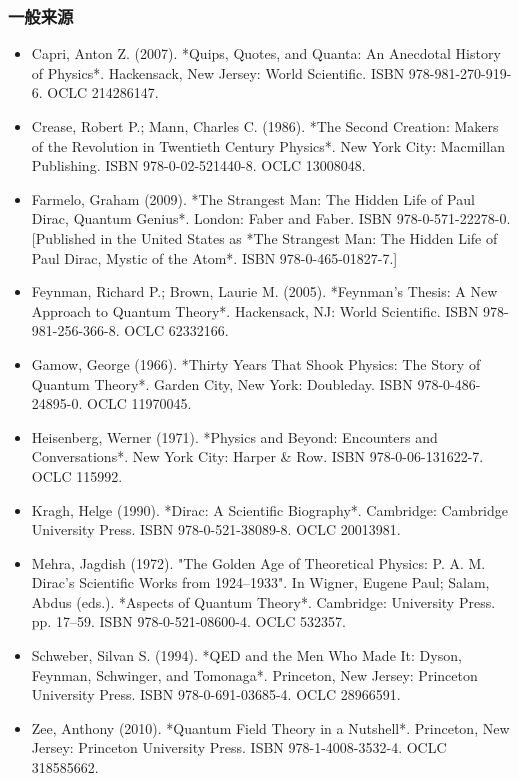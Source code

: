 \subsubsection{一般来源}
\begin{itemize}
\item Capri, Anton Z. (2007). *Quips, Quotes, and Quanta: An Anecdotal History of Physics*. Hackensack, New Jersey: World Scientific. ISBN 978-981-270-919-6. OCLC 214286147.
\item Crease, Robert P.; Mann, Charles C. (1986). *The Second Creation: Makers of the Revolution in Twentieth Century Physics*. New York City: Macmillan Publishing. ISBN 978-0-02-521440-8. OCLC 13008048.
\item Farmelo, Graham (2009). *The Strangest Man: The Hidden Life of Paul Dirac, Quantum Genius*. London: Faber and Faber. ISBN 978-0-571-22278-0. [Published in the United States as *The Strangest Man: The Hidden Life of Paul Dirac, Mystic of the Atom*. ISBN 978-0-465-01827-7.]
\item Feynman, Richard P.; Brown, Laurie M. (2005). *Feynman's Thesis: A New Approach to Quantum Theory*. Hackensack, NJ: World Scientific. ISBN 978-981-256-366-8. OCLC 62332166.
\item Gamow, George (1966). *Thirty Years That Shook Physics: The Story of Quantum Theory*. Garden City, New York: Doubleday. ISBN 978-0-486-24895-0. OCLC 11970045.
\item Heisenberg, Werner (1971). *Physics and Beyond: Encounters and Conversations*. New York City: Harper & Row. ISBN 978-0-06-131622-7. OCLC 115992.
\item Kragh, Helge (1990). *Dirac: A Scientific Biography*. Cambridge: Cambridge University Press. ISBN 978-0-521-38089-8. OCLC 20013981.
\item Mehra, Jagdish (1972). "The Golden Age of Theoretical Physics: P. A. M. Dirac's Scientific Works from 1924–1933". In Wigner, Eugene Paul; Salam, Abdus (eds.). *Aspects of Quantum Theory*. Cambridge: University Press. pp. 17–59. ISBN 978-0-521-08600-4. OCLC 532357.
\item Schweber, Silvan S. (1994). *QED and the Men Who Made It: Dyson, Feynman, Schwinger, and Tomonaga*. Princeton, New Jersey: Princeton University Press. ISBN 978-0-691-03685-4. OCLC 28966591.
\item Zee, Anthony (2010). *Quantum Field Theory in a Nutshell*. Princeton, New Jersey: Princeton University Press. ISBN 978-1-4008-3532-4. OCLC 318585662.
\end{itemize}